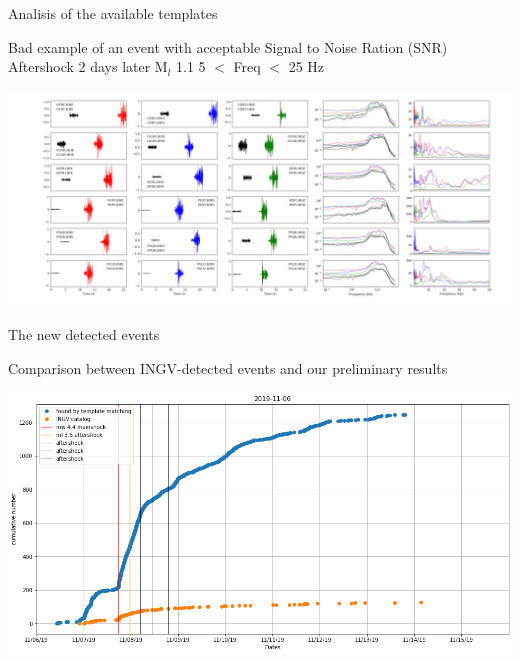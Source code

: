 \documentclass[aspectratio=43,9pt]{beamer}
\begin{document}
\begin{frame}{Analisis of the available templates}
 
   \begin{minipage}{1\linewidth}
    \centering Bad example of an event with acceptable Signal to Noise Ration (SNR) 
    \vskip 0.4cm 
    \centering Aftershock 2 days later M$_l$ 1.1  5 $<$ Freq  $<$ 25 Hz 
    \begin{center}
     \includegraphics[width=1\linewidth]{figs/ml_1p1-2019-11-08T12-00-43_phase_arrivals.png}     
    \end{center}
  \end{minipage}
   
\end{frame}


\begin{frame}{The new detected events}
 
   \begin{minipage}{1\linewidth}
    \centering Comparison between INGV-detected events and our preliminary results 
    \vskip 0.4cm 
    \begin{center}
     \includegraphics[width=1\linewidth]{figs/cumulative_events.png}     
    \end{center}
  \end{minipage}
   
\end{frame}
\end{document}
